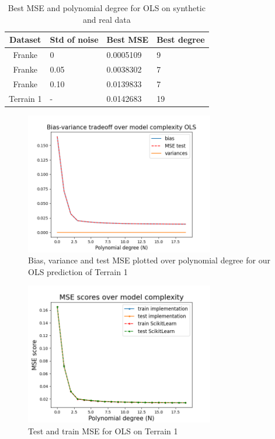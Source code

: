 \documentclass[twocolumn,10pt,cleanfoot]{asme2ej}
\begin{document}
\begin{table}[t]
\caption{Best MSE and polynomial degree for OLS on synthetic and real data}
\begin{center}
\label{ols_mse_table_dif_data}
\begin{tabular}{c l l l}
Dataset & Std of noise & Best MSE & Best degree \\
\hline
Franke & 0 & 0.0005109 & 9\\
Franke & 0.05 & 0.0038302 & 7 \\
Franke & 0.10 & 0.0139833 & 7 \\
Terrain 1 & - & 0.0142683 & 19 \\
\hline
\end{tabular}
\end{center}
\end{table}

\begin{figure} 
\centerline{\includegraphics[width=3.25in]{figure/realbiasvarianceOLS.png}}
\caption{Bias, variance and test MSE plotted over polynomial degree for our OLS prediction of Terrain 1}
\label{realbiasvarianceOLS}
\end{figure}



\begin{figure} 
\centerline{\includegraphics[width=3.25in]{figure/real1msetraintest.png}}
\caption{Test and train MSE for OLS on Terrain 1}
\label{real1msetraintest}
\end{figure}
\end{document}
